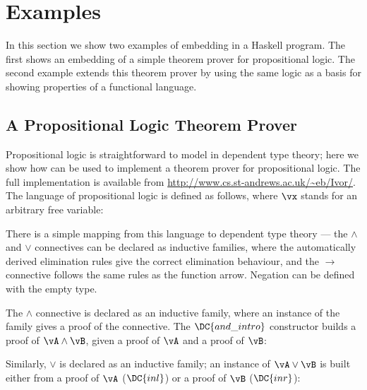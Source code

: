 \section{Examples}

In this section we show two examples of embedding \Ivor{} in a Haskell
program. The first shows an embedding of a simple theorem prover for
propositional logic. The second example extends this theorem prover by
using the same logic as a basis for showing properties of a functional
language.

\subsection{A Propositional Logic Theorem Prover}

\label{example1}

Propositional logic is straightforward to model in dependent type
theory; here we show how \Ivor{} can be used to implement a theorem
prover for propositional logic. The full implementation is available
from \url{http://www.cs.st-andrews.ac.uk/~eb/Ivor/}.  The language of
propositional logic is defined as follows, where $\vx$ stands for an
arbitrary free variable:


\newcommand{\Tand}{\TC{And}}
\newcommand{\andintro}{\DC{and\_intro}}
\newcommand{\Tor}{\TC{Or}}
\newcommand{\orintrol}{\DC{inl}}
\newcommand{\orintror}{\DC{inr}}

There is a simple mapping from this language to dependent type theory
--- the $\land$ and $\lor$ connectives can be declared as inductive
families, where the automatically derived elimination rules give the
correct elimination behaviour, and the $\to$ connective follows the
same rules as the function arrow. Negation can be defined with the
empty type.

The $\land$ connective is declared as an inductive family, where an
instance of the family gives a proof of the connective. The $\andintro$
constructor builds a proof of $\vA\land\vB$, given a proof of $\vA$ and
a proof of $\vB$:

\DM{
\AR{
\Data\:\Tand\:(\vA,\vB\Hab\Type)\Hab\Type\hg\Where\\
\hg\hg
\andintro\Hab\fbind{\va}{\vA}{\fbind{\vb}{\vB}{\Tand\:\vA\:\vB}}
}
}

Similarly, $\lor$ is declared as an inductive family; an instance of
$\vA\lor\vB$ is built either from a proof of $\vA$ ($\orintrol$) or a
proof of $\vB$ ($\orintror$):

